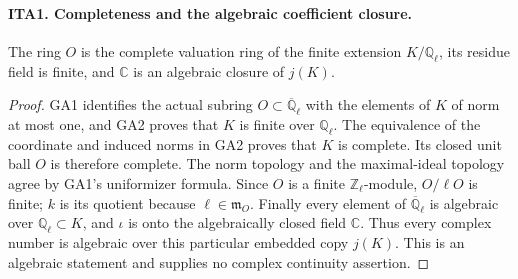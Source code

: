 \documentclass[11pt,a4paper]{article}
\numberwithin{equation}{section}
\theoremstyle{remark}\newtheorem{remark}[theorem]{Remark}
\begin{document}
\paragraph{ITA1. Completeness and the algebraic coefficient closure.}
\label{claim:ITA1}
The ring $O$ is the complete valuation ring of the finite extension
$K/\mathbb Q_\ell$, its residue field is finite, and
$\mathbb C$ is an algebraic closure of $j(K)$.
\begin{proof}
GA1 identifies the actual subring $O\subset\overline{\mathbb Q}_\ell$
with the elements of $K$ of norm at most one, and GA2 proves
that $K$ is finite over $\mathbb Q_\ell$.  The equivalence of
the coordinate and induced norms in GA2 proves that $K$ is
complete.  Its closed unit ball $O$ is therefore complete.
The norm topology and the maximal-ideal topology agree by
GA1's uniformizer formula.  Since $O$ is a finite
$\mathbb Z_\ell$-module, $O/\ell O$ is finite; $k$ is its
quotient because $\ell\in\mathfrak m_O$.  Finally every
element of $\overline{\mathbb Q}_\ell$ is algebraic over
$\mathbb Q_\ell\subset K$, and $\iota$ is onto the
algebraically closed field $\mathbb C$.  Thus every complex
number is algebraic over this particular embedded copy $j(K)$.
This is an algebraic statement and supplies no complex
continuity assertion.
\end{proof}

\end{document}
